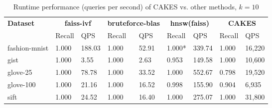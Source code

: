 \begin{table*}[!t]
    \caption{Runtime performance (queries per second) of CAKES vs. other methods, $k=10$}
    \label{table:results:ann-10}
    \vskip 0.15in
    \begin{center}
    \begin{small}
    \begin{sc}
    \begin{tabular}{|l|p{1cm}|p{1cm}|p{1cm}|p{1cm}|p{1cm}|p{1cm}|p{1cm}|p{1cm}|}
    \textbf{Dataset}  & \multicolumn{2}{|c|}{\textbf{faiss-ivf}} & \multicolumn{2}{|c|}{\textbf{bruteforce-blas}} & \multicolumn{2}{|c|}{\textbf{hnsw(faiss)}} & \multicolumn{2}{|c|}{\textbf{CAKES}} \\
    \cline{2-9}
    &                    Recall & QPS                           & Recall & QPS                           & Recall & QPS                                           & Recall & QPS \\
    \hline
    fashion-mnist      & 1.000 & 188.03                           & 1.000 & 52.91                                  & 1.000* & 339.74                                                    & 1.000 & 16,220 \\
    \hline
    gist                   & 1.000 & 3.55                           & 1.000 & 2.63                                     & 0.953 & 149.58                                                   & 1.000 & 10,600 \\
    \hline
    glove-25              & 1.000 & 78.78                          & 1.000 & 33.52                              & 1.000 & 552.67                                                  & 0.798 & 19,520 \\
    \hline
    glove-100             & 1.000 & 21.16                          & 1.000 & 16.52                                & 0.998 & 155.90                                                  & 0.904 & 6,935 \\
    \hline
    sift                  & 1.000 &  24.52                          & 1.000 & 16.40                               & 1.000 & 275.07                                                    & 1.000 & 31,800 \\
    \hline
    \end{tabular}
    \end{sc}
    \end{small}
    \end{center}
    \vskip -0.1in
    \end{table*}


